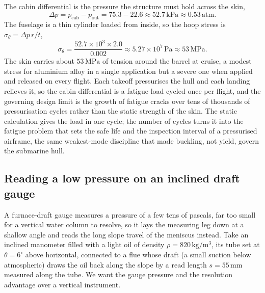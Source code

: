 The cabin differential is the pressure the structure must hold across the
skin,
\[
\Delta p = p_{\text{cab}} - p_{\text{out}}
= 75.3 - 22.6 \approx 52.7\,\text{kPa} \approx 0.53\,\text{atm}.
\]
The fuselage is a thin cylinder loaded from inside, so the hoop stress is
$\sigma_\theta = \Delta p\, r/t$,
\[
\sigma_\theta = \frac{52.7 \times 10^3 \times 2.0}{0.002}
\approx 5.27 \times 10^7\,\text{Pa}
\approx 53\,\text{MPa}.
\]
The skin carries about $53\,\text{MPa}$ of tension around the barrel at
cruise, a modest stress for aluminium alloy in a single application but a
severe one when applied and released on every flight. Each takeoff
pressurises the hull and each landing relieves it, so the cabin
differential is a fatigue load cycled once per flight, and the governing
design limit is the growth of fatigue cracks over tens of thousands of
pressurisation cycles rather than the static strength of the skin. The
static calculation gives the load in one cycle; the number of cycles turns
it into the fatigue problem that sets the safe life and the inspection
interval of a pressurised airframe, the same weakest-mode discipline that
made buckling, not yield, govern the submarine hull.

\subsection{Reading a low pressure on an inclined draft gauge}

A furnace-draft gauge measures a pressure of a few tens of pascals, far too
small for a vertical water column to resolve, so it lays the measuring leg
down at a shallow angle and reads the long slope travel of the meniscus
instead. Take an inclined manometer filled with a light oil of density
$\rho = 820\,\si{\kilogram\per\meter\cubed}$, its tube set at $\theta =
6^{\circ}$ above horizontal, connected to a flue whose draft (a small
suction below atmospheric) draws the oil back along the slope by a read
length $s = 55\,\si{\milli\meter}$ measured along the tube. We want the
gauge pressure and the resolution advantage over a vertical instrument.

